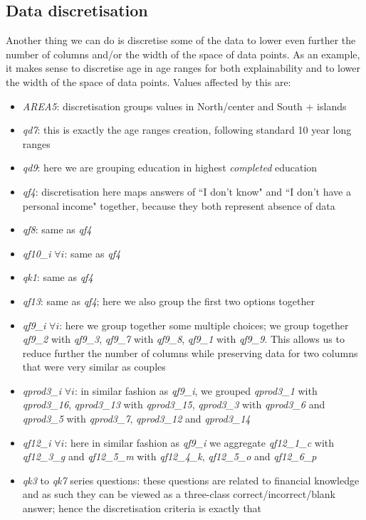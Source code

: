 \documentclass[a4paper,11pt]{article}
\begin{document}
\subsection{Data discretisation}
Another thing we can do is discretise some of the data to lower even further the number of columns and/or the width of the space of data points. As an example, it makes sense to discretise age in age ranges for both explainability and to lower the width of the space of data points. Values affected by this are:
\begin{itemize}
    \item \textit{AREA5}: discretisation groups values in North/center and South + islands
    \item \textit{qd7}: this is exactly the age ranges creation, following standard 10 year long ranges
    \item \textit{qd9}: here we are grouping education in highest \textit{completed} education
    \item \textit{qf4}: discretisation here maps answers of ``I don't know" and ``I don't have a personal income" together, because they both represent absence of data
    \item \textit{qf8}: same as \textit{qf4}
    \item \textit{qf10\_i} $\forall i$: same as \textit{qf4}
    \item \textit{qk1}: same as \textit{qf4}
    \item \textit{qf13}: same as \textit{qf4}; here we also group the first two options together
    \item \textit{qf9\_i} $\forall i$: here we group together some multiple choices; we group together \textit{qf9\_2} with \textit{qf9\_3}, \textit{qf9\_7} with \textit{qf9\_8}, \textit{qf9\_1} with \textit{qf9\_9}. This allows us to reduce further the number of columns while preserving data for two columns that were very similar as couples
    \item \textit{qprod3\_i} $\forall i$: in similar fashion as \textit{qf9\_i}, we grouped \textit{qprod3\_1} with \textit{qprod3\_16}, \textit{qprod3\_13} with \textit{qprod3\_15}, \textit{qprod3\_3} with \textit{qprod3\_6} and \textit{qprod3\_5} with \textit{qprod3\_7}, \textit{qprod3\_12} and \textit{qprod3\_14}
    \item \textit{qf12\_i} $\forall i$: here in similar fashion as \textit{qf9\_i} we aggregate \textit{qf12\_1\_c} with \textit{qf12\_3\_g} and \textit{qf12\_5\_m} with \textit{qf12\_4\_k}, \textit{qf12\_5\_o} and \textit{qf12\_6\_p}
    \item \textit{qk3} to \textit{qk7} series questions: these questions are related to financial knowledge and as such they can be viewed as a three-class correct/incorrect/blank answer; hence the discretisation criteria is exactly that
\end{itemize}
\end{document}
